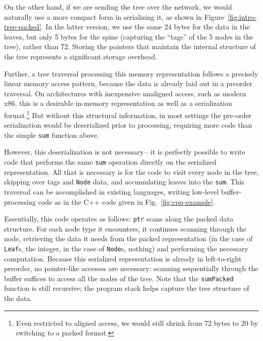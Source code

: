 \documentclass[showabstract,showacknowledgments,showpreface,showdedication,school]{iuphd}
\theoremstyle{nonumberplain}
\newcommand{\Figref}[1]{Fig.~\ref{#1}}
\newcommand{\il}[1]{\lstinline[style=inline,mathescape=true];#1;}
\begin{document}
On the other hand, if we are
sending the tree over the network, we would naturally use a more
compact form in serializing it, as shown in
Figure~\ref{fig:intro-tree-packed}.  In the latter version, we use the
same 24 bytes for the data in the leaves, but only 5 bytes for the
spine (capturing the ``tags'' of the 5 nodes in the tree), rather than
72.  
Storing the pointers that maintain
the internal structure of the tree represents a significant storage overhead.


Further, a tree traversal processing this memory representation
follows a precisely linear memory access pattern, because the data is
already laid out in a preorder traversal.
On architectures with inexpensive unaligned access, such as modern
x86, this is a desirable in-memory representation as well as a
serialization format.\footnote{Even restricted to aligned access, we
  would still shrink from 72 bytes to 20 by switching to a packed
  format.}
But without this structural information, in most settings the
pre-order serialization would be deserialized prior to processing,
requiring more code than the simple \il{sum} function above.

However, this deserialization
is not necessary---it is perfectly possible to write code that performs
the same \il{sum} operation directly on the serialized representation.
All that is necessary is for the code to visit every node in the tree, skipping over
tags and \il{Node} data, and accumulating leaves into the \il{sum}.
This traversal can be accomplished in existing languages, writing low-level
buffer-processing code as in the C++ code given in \Figref{fig:cpp-example}.

Essentially, this code operates as follows: \il{ptr} scans along the packed
data structure. For each node type it encounters, it continues scanning
through the node, retrieving the data it needs from the packed representation
(in the case of \il{Leaf}s, the integer, in the case of \il{Node}s,
nothing) and performing the necessary computation. Because this serialized
representation is already in left-to-right preorder, no pointer-like
accesses are necessary: scanning sequentially through the buffer suffices to
access all the nodes of the tree. Note that the \il{sumPacked} function is
still recursive; the program stack helps capture the tree structure of the
data.
\end{document}
